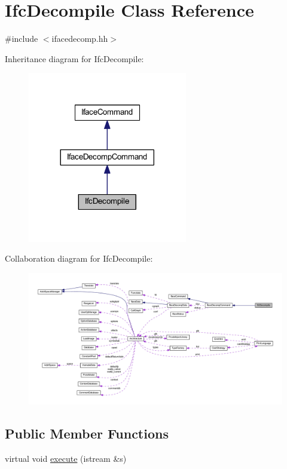 \hypertarget{class_ifc_decompile}{}\section{Ifc\+Decompile Class Reference}
\label{class_ifc_decompile}


{\ttfamily \#include $<$ifacedecomp.\+hh$>$}



Inheritance diagram for Ifc\+Decompile\+:
\nopagebreak
\begin{figure}[H]
\begin{center}
\leavevmode
\includegraphics[width=197pt]{class_ifc_decompile__inherit__graph}
\end{center}
\end{figure}


Collaboration diagram for Ifc\+Decompile\+:
\nopagebreak
\begin{figure}[H]
\begin{center}
\leavevmode
\includegraphics[width=350pt]{class_ifc_decompile__coll__graph}
\end{center}
\end{figure}
\subsection*{Public Member Functions}
\begin{DoxyCompactItemize}
\item 
virtual void \mbox{\hyperlink{class_ifc_decompile_acf3a1c4ebd4069695d56d89c2babcf28}{execute}} (istream \&s)
\end{DoxyCompactItemize}
